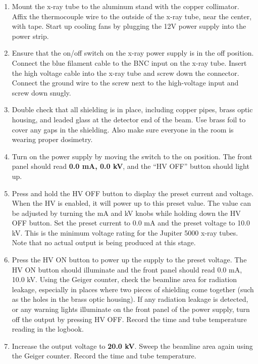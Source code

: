 \begin{enumerate}

\item Mount the x-ray tube to the aluminum stand with the copper collimator. Affix the thermocouple wire to the outside of the x-ray tube, near the center, with tape. Start up cooling fans by plugging the 12V power supply into the power strip.

\item Ensure that the on/off switch on the x-ray power supply is in the off position. Connect the blue filament cable to the BNC input on the x-ray tube. Insert the high voltage cable into the x-ray tube and screw down the connector. Connect the ground wire to the screw next to the high-voltage input and screw down snugly.

\item Double check that all shielding is in place, including copper pipes, brass optic housing, and leaded glass at the detector end of the beam. Use brass foil to cover any gaps in the shielding. Also make sure everyone in the room is wearing proper dosimetry.

\item Turn on the power supply by moving the switch to the on position. The front panel should read \textbf{0.0 mA, 0.0 kV}, and the “HV OFF” button should light up.

\item Press and hold the HV OFF button to display the preset current and voltage. When the HV is enabled, it will power up to this preset value. The value can be adjusted by turning the mA and kV knobs while holding down the HV OFF button. Set the preset current to 0.0 mA and the preset voltage to 10.0 kV. This is the minimum voltage rating for the Jupiter 5000 x-ray tubes. Note that no actual output is being produced at this stage.

\item \label{item:on} Press the HV ON button to power up the supply to the preset voltage. The HV ON button should illuminate and the front panel should read 0.0 mA, 10.0 kV. Using the Geiger counter, check the beamline area for radiation leakage, especially in places where two pieces of shielding come together (such as the holes in the brass optic housing). If any radiation leakage is detected, or any warning lights illuminate on the front panel of the power supply, turn off the output by pressing HV OFF. Record the time and tube temperature reading in the logbook. 

\item Increase the output voltage to \textbf{20.0 kV}. Sweep the beamline area again using the Geiger counter. Record the time and tube temperature.


\end{enumerate}
